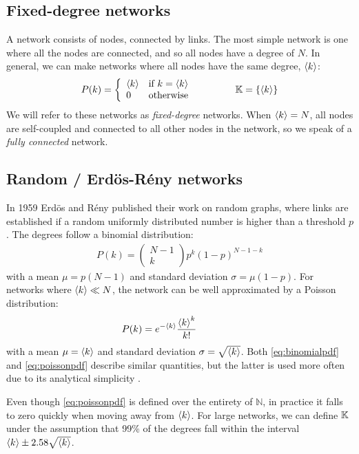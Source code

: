 \subsection{Fixed-degree networks}
\noindent A network consists of nodes, connected by links. The most simple network is one where all the nodes are connected, and so all nodes have a degree of $N$. In general, we can make networks where all nodes have the same degree, ${\langle k\rangle}$:
\begin{align}
P(k) = \left\{\begin{array}{ll}\kmean & \text{if } k=\kmean \\0 & \text{otherwise}\end{array}\right. \hspace{15mm} \K = \{ \kmean \} \label{eq:diracpdf}
\end{align}
We will refer to these networks as \textsl{fixed-degree} networks. When ${\langle k\rangle} = N$, all nodes are self-coupled and connected to all other nodes in the network, so we speak of a \textsl{fully connected} network. 


\subsection{Random / Erd{\"o}s-R{\'e}ny networks}
In 1959 Erd{\"o}s and R{\'e}ny published their work on random graphs\cite{RandomGraphs1959}, where links are established if a random uniformly distributed number is higher than a threshold $p$. The degrees follow a binomial distribution: 
\begin{align}
P(k)=\left(\begin{array}{c}N-1 \\ k\end{array}\right) p^{k}(1-p)^{N-1-k} \label{eq:binomialpdf}
\end{align}
with a mean $\mu = p(N-1)$ and standard deviation $\sigma = \mu(1-p)$. For networks where ${\langle k\rangle} \ll N$, the network can be well approximated by a Poisson distribution:
\begin{align}
P(k) = e^{-\kmean} \frac{\kmean^{k}}{k !} \hspace{15mm} \label{eq:poissonpdf}
\end{align}
with a mean $\mu = {\langle k\rangle}$ and standard deviation $\sigma = \sqrt{{\langle k\rangle}}$. Both \eqref{eq:binomialpdf} and \eqref{eq:poissonpdf} describe similar quantities, but the latter is used more often due to its analytical simplicity \cite{BarabasiNetworkBook2016}. 

Even though \eqref{eq:poissonpdf} is defined over the entirety of $\mathbb{N}$, in practice it falls to zero quickly when moving away from ${\langle k\rangle}$. For large networks, we can define ${\mathbb{K}}$ under the assumption that 99\% of the degrees fall within the interval ${\langle k\rangle} \pm 2.58 \sqrt{{\langle k\rangle}}$.

